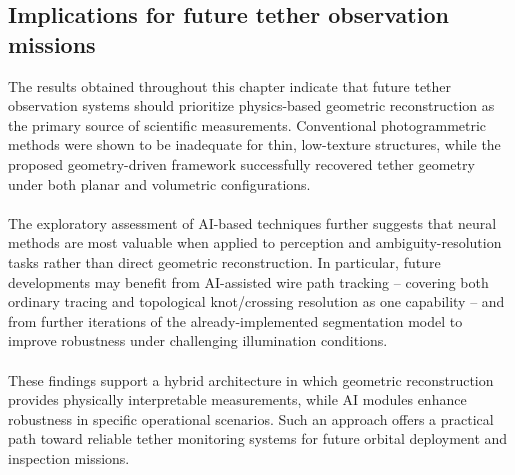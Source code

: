 \subsection{Implications for future tether observation missions}

The results obtained throughout this chapter indicate that future tether observation systems should prioritize physics-based geometric reconstruction as the primary source of scientific measurements. Conventional photogrammetric methods were shown to be inadequate for thin, low-texture structures, while the proposed geometry-driven framework successfully recovered tether geometry under both planar and volumetric configurations.
\\\\
The exploratory assessment of AI-based techniques further suggests that neural methods are most valuable when applied to perception and ambiguity-resolution tasks rather than direct geometric reconstruction. In particular, future developments may benefit from AI-assisted wire path tracking -- covering both ordinary tracing and topological knot/crossing resolution as one capability -- and from further iterations of the already-implemented segmentation model to improve robustness under challenging illumination conditions.
\\\\
These findings support a hybrid architecture in which geometric reconstruction provides physically interpretable measurements, while AI modules enhance robustness in specific operational scenarios. Such an approach offers a practical path toward reliable tether monitoring systems for future orbital deployment and inspection missions.

